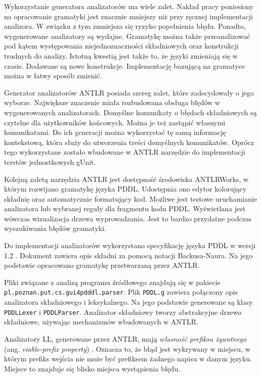 Wykorzystanie generatora analizatorów ma wiele zalet. Nakład pracy poniesiony na
opracowanie gramatyki jest znacznie mniejszy niż przy ręcznej implementacji analizora.
W związku z tym zmniejsza się ryzyko popełnienia błędu. Ponadto, wygenerowane analizatory są 
wydajne. Gramatykę można także przeanalizować pod kątem występowania niejednoznaczności
składniowych
oraz konstrukcji trudnych do analizy. Istotną kwestią jest także to, że
języki zmieniają się w czasie. Dodawane są nowe konstrukcje. %
Implementację bazującą na gramatyce można w łatwy sposób zmienić.

Generator analizatorów ANTLR posiada szereg zalet, które zadecydowały o jego wyborze.
Największe znaczenie miała rozbudowana obsługa błędów w wygenerowanych analizatorach.
Domyślne komunikaty o błędach składniowych są czytelne dla użytkowników końcowych.
Można je też zastąpić własnymi komunikatami. Do ich generacji można wykorzystać tę samą 
informację kontekstową, która służy do utworzenia treści domyślnych komunikatów.
Oprócz tego wykorzystane zostało wbudowane w ANTLR narzędzie do implementacji
terstów jednostkowych gUnit.

Kolejną zaletą narzędzia ANTLR jest dostępność środowiska ANTLRWorks, w którym
rozwijano gramatykę języka PDDL. Udostępnia 
ono edytor kolorujący składnię oraz automatycznie formatujący kod. Możliwe jest
testowe uruchamianie analizatora lub wybranej reguły dla fragmentu kodu PDDL.
Wyświetlana jest wówczas wizualizacja drzewa wyprowadzania. Jest to bardzo przydatne
podczas wyszukiwania błędów gramatyki.

Do implementacji analizatorów wykorzystano specyfikację języka PDDL w wersji 1.2 \cite{pddl}.
Dokument zawiera opis składni za pomocą notacji Backusa-Naura. Na jego podstawie opracowano
gramatykę przetwarzaną przez ANTLR.

\begin{sloppypar}
Pliki związane z analizą programu źródłowego znajdują się w pakiecie 
\texttt{pl.poznan.put.cs.gui4pdddl.parser}.
Plik \texttt{PDDL.g} zawiera połączony opis analizatora
składniowego i leksykalnego.  %
Na jego podstawie generowane są klasy \texttt{PDDLLexer} i \texttt{PDDLParser}.
Analizator składniowy tworzy abstrakcyjne drzewo składniowe, używając mechanizmów
wbudowanych w ANTLR.
\end{sloppypar}


Analizatory LL, generowane przez ANTLR, mają \emph{własność prefiksu żywotnego} (ang. \emph{viable-prefix property}) \cite{compilers,compilersEN}. %
Oznacza to, że błąd jest wykrywany w miejscu, w którym prefiks wejścia nie może
być prefiksem żadnego napisu w danym języku. Miejsce to znajduje się blisko miejsca
wystąpienia błędu.

